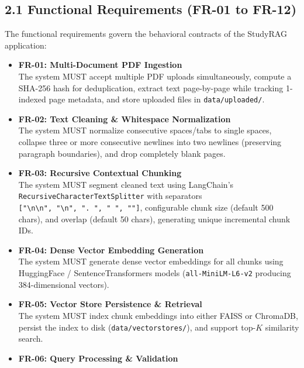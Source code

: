 \documentclass[
]{article}
\providecommand{\tightlist}{%
  \setlength{\itemsep}{0pt}\setlength{\parskip}{0pt}}
\begin{document}
\subsection{2.1 Functional Requirements (FR-01 to
FR-12)}\label{functional-requirements-fr-01-to-fr-12}

The functional requirements govern the behavioral contracts of the
StudyRAG application:

\begin{itemize}
\tightlist
\item
  \textbf{FR-01: Multi-Document PDF Ingestion}\\
  The system MUST accept multiple PDF uploads simultaneously, compute a
  SHA-256 hash for deduplication, extract text page-by-page while
  tracking 1-indexed page metadata, and store uploaded files in
  \texttt{data/\allowbreak uploaded/\allowbreak }.
\item
  \textbf{FR-02: Text Cleaning \& Whitespace Normalization}\\
  The system MUST normalize consecutive spaces/tabs to single spaces,
  collapse three or more consecutive newlines into two newlines
  (preserving paragraph boundaries), and drop completely blank pages.
\item
  \textbf{FR-03: Recursive Contextual Chunking}\\
  The system MUST segment cleaned text using LangChain's
  \texttt{RecursiveCharacterTextSplitter} with separators
  \texttt{{[}"\textbackslash{}n\textbackslash{}n",\allowbreak \ \allowbreak "\textbackslash{}n",\allowbreak \ \allowbreak ".\ \allowbreak ",\allowbreak \ \allowbreak "\ \allowbreak ",\allowbreak \ \allowbreak ""{]}},
  configurable chunk size (default 500 chars), and overlap (default 50
  chars), generating unique incremental chunk IDs.
\item
  \textbf{FR-04: Dense Vector Embedding Generation}\\
  The system MUST generate dense vector embeddings for all chunks using
  HuggingFace / SentenceTransformers models (\texttt{all-MiniLM-L6-v2}
  producing 384-dimensional vectors).
\item
  \textbf{FR-05: Vector Store Persistence \& Retrieval}\\
  The system MUST index chunk embeddings into either FAISS or ChromaDB,
  persist the index to disk (\texttt{data/\allowbreak vectorstores/\allowbreak }), and support
  top-\(K\) similarity search.
\item
  \textbf{FR-06: Query Processing \& Validation}\\

\end{itemize}
\end{document}
